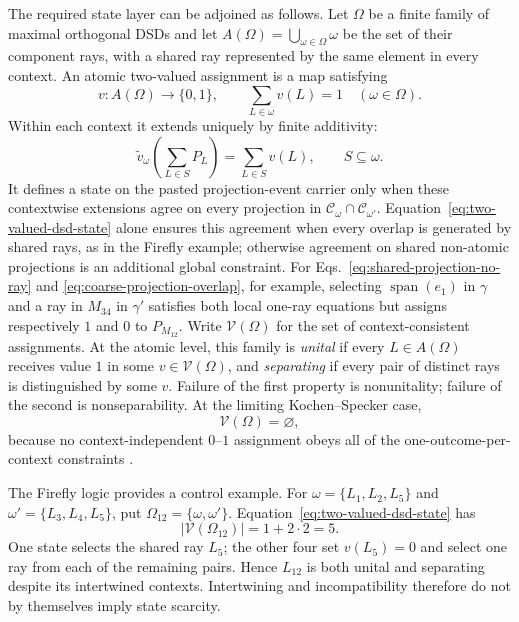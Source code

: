 \documentclass[aps,pra,reprint,nofootinbib]{revtex4-2}
\newcommand{\Span}{\operatorname{span}}
\begin{document}
The required state layer can be adjoined as follows.  Let
$\Omega$ be a finite family of maximal orthogonal DSDs and let
$A(\Omega)=\bigcup_{\omega\in\Omega}\omega$ be the set of their component
rays, with a shared ray represented by the same element in every context.  An
atomic two-valued assignment is a map satisfying
\begin{equation}
  v:A(\Omega)\longrightarrow\{0,1\},
  \qquad
  \sum_{L\in\omega}v(L)=1
  \quad(\omega\in\Omega).
  \label{eq:two-valued-dsd-state}
\end{equation}
Within each context it extends uniquely by finite additivity:
\begin{equation}
  \widetilde v_\omega\!\left(\sum_{L\in S}P_L\right)
  =\sum_{L\in S}v(L),
  \qquad S\subseteq\omega.
  \label{eq:contextwise-state-extension}
\end{equation}
It defines a state on the pasted projection-event carrier only when these
contextwise extensions agree on every projection in
$\mathcal C_\omega\cap\mathcal C_{\omega'}$.  Equation~\eqref{eq:two-valued-dsd-state}
alone ensures this agreement when every overlap is generated by shared rays,
as in the Firefly example; otherwise agreement on shared non-atomic projections
is an additional global constraint.  For Eqs.~\eqref{eq:shared-projection-no-ray}
and \eqref{eq:coarse-projection-overlap}, for example, selecting $\Span(e_1)$
in $\gamma$ and a ray in $M_{34}$ in $\gamma'$ satisfies both local
one-ray equations but assigns respectively $1$ and $0$ to $P_{M_{12}}$.
Write $\mathcal V(\Omega)$ for the set of
context-consistent assignments.  At the atomic level,
this family is \emph{unital} if every $L\in A(\Omega)$ receives value $1$ in
some $v\in\mathcal V(\Omega)$, and \emph{separating} if every pair of distinct
rays is distinguished by some $v$.  Failure of the first property is
nonunitality; failure of the second is nonseparability.  At the limiting
Kochen--Specker case,
\begin{equation}
  \mathcal V(\Omega)=\varnothing,
  \label{eq:ks-empty-state-space}
\end{equation}
because no context-independent $0$--$1$ assignment obeys all of the
one-outcome-per-context constraints \cite{kochen1,svozil-tkadlec}.

The Firefly logic provides a control example.  For
$\omega=\{L_1,L_2,L_5\}$ and $\omega'=\{L_3,L_4,L_5\}$, put
$\Omega_{12}=\{\omega,\omega'\}$.  Equation~\eqref{eq:two-valued-dsd-state}
has
\begin{equation}
  |\mathcal V(\Omega_{12})|=1+2\mathbin{\cdot}2=5.
  \label{eq:firefly-state-count}
\end{equation}
One state selects the shared ray $L_5$; the other four set $v(L_5)=0$ and
select one ray from each of the remaining pairs.  Hence $L_{12}$ is both
unital and separating despite its intertwined contexts.  Intertwining and
incompatibility therefore do not by themselves imply state scarcity.
\end{document}
